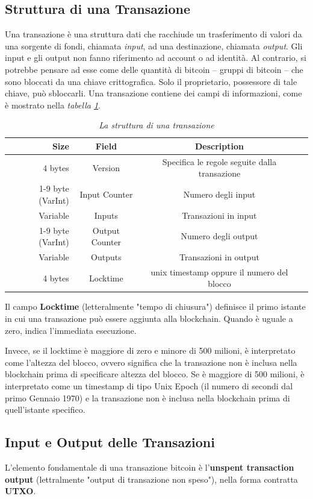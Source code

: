 \subsection{Struttura di una Transazione}
Una transazione è una struttura dati che racchiude un trasferimento di valori da una sorgente di fondi, chiamata \textit{input}, ad una destinazione, chiamata \textit{output}. Gli input e gli output non fanno riferimento ad account o ad identità. Al contrario, si potrebbe pensare ad esse come delle quantità di bitcoin -- gruppi di bitcoin -- che sono bloccati da una chiave crittografica. Solo il proprietario, possessore di tale chiave, può sbloccarli. Una transazione contiene dei campi di informazioni, come è mostrato nella \textit{tabella \ref{tab:txstructure}}.
\begin{table}[htbp]

	\begin{tabular}{r|c|c|c|}
		Size&Field &Description\\ \hline
		4 bytes&Version&Specifica le regole seguite dalla transazione\\
		1-9 byte (VarInt)&Input Counter&Numero degli input\\ 
		Variable&Inputs&Transazioni in input\\ 
		1-9 byte (VarInt)&Output Counter&Numero degli output\\
		Variable&Outputs&Transazioni in output\\
		4 bytes&Locktime&unix timestamp oppure il numero del blocco\\
		\hline
	\end{tabular}

	\caption{\textit{La struttura di una transazione}\label{tab:txstructure}}
\end{table}

Il campo \textbf{Locktime} (letteralmente "tempo di chiusura") definisce il primo istante in cui una transazione può essere aggiunta alla blockchain. Quando è uguale a zero, indica l'immediata esecuzione. 

Invece, se il locktime è maggiore di zero e minore di 500 milioni, è interpretato come l'altezza del blocco, ovvero significa che la transazione non è inclusa nella blockchain prima di specificare altezza del blocco. Se è maggiore di 500 milioni, è interpretato come un timestamp di tipo Unix Epoch (il numero di secondi dal primo Gennaio 1970) e la transazione non è inclusa nella blockchain prima di quell'istante specifico.


\subsection{Input e Output delle Transazioni}
L'elemento fondamentale di una transazione bitcoin è l'\textbf{unspent transaction output} (lettralmente "output di transazione non speso"), nella forma contratta \textbf{UTXO}.

